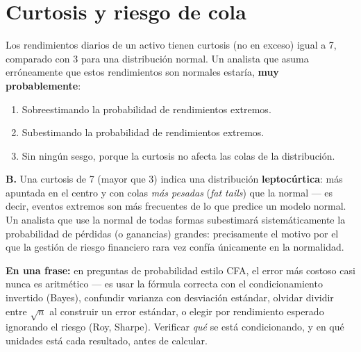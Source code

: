 \documentclass[11pt,a4paper,oneside]{article}
\theoremstyle{definition}
\begin{document}
\section{Curtosis y riesgo de cola}

\begin{cfaBox}
Los rendimientos diarios de un activo tienen curtosis (no en exceso) igual
a 7, comparado con 3 para una distribución normal. Un analista que asuma
erróneamente que estos rendimientos son normales estaría, \textbf{muy
probablemente}:
\begin{enumerate}[label=\Alph*.]
\item Sobreestimando la probabilidad de rendimientos extremos.
\item Subestimando la probabilidad de rendimientos extremos.
\item Sin ningún sesgo, porque la curtosis no afecta las colas de la distribución.
\end{enumerate}
\end{cfaBox}
\begin{solBox}
\textbf{B.} Una curtosis de 7 (mayor que 3) indica una distribución
\textbf{leptocúrtica}: más apuntada en el centro y con colas \emph{más
pesadas} (\emph{fat tails}) que la normal --- es decir, eventos extremos
son más frecuentes de lo que predice un modelo normal. Un analista que use
la normal de todas formas subestimará sistemáticamente la probabilidad de
pérdidas (o ganancias) grandes: precisamente el motivo por el que la
gestión de riesgo financiero rara vez confía únicamente en la normalidad.
\end{solBox}

\begin{summaryBox}
\textbf{En una frase:} en preguntas de probabilidad estilo CFA, el error
más costoso casi nunca es aritmético --- es usar la fórmula correcta con
el condicionamiento invertido (Bayes), confundir varianza con desviación
estándar, olvidar dividir entre $\sqrt n$ al construir un error estándar,
o elegir por rendimiento esperado ignorando el riesgo (Roy, Sharpe).
Verificar \emph{qué} se está condicionando, y en qué unidades está cada
resultado, antes de calcular.
\end{summaryBox}
\end{document}
